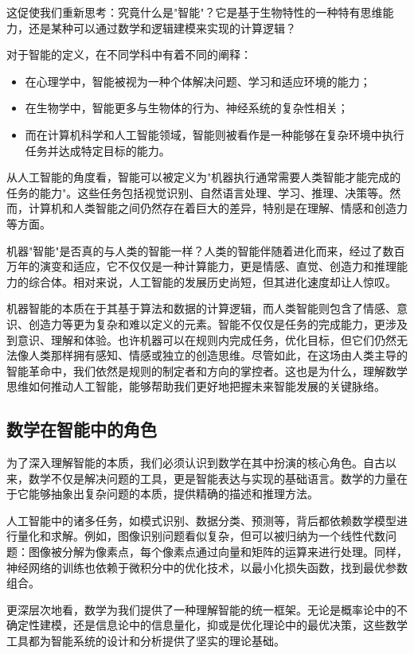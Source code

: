这促使我们重新思考：究竟什么是"智能"？它是基于生物特性的一种特有思维能力，还是某种可以通过数学和逻辑建模来实现的计算逻辑？

对于智能的定义，在不同学科中有着不同的阐释：
\begin{itemize}
\item 在心理学中，智能被视为一种个体解决问题、学习和适应环境的能力；
\item 在生物学中，智能更多与生物体的行为、神经系统的复杂性相关；
\item 而在计算机科学和人工智能领域，智能则被看作是一种能够在复杂环境中执行任务并达成特定目标的能力。
\end{itemize}

从人工智能的角度看，智能可以被定义为"机器执行通常需要人类智能才能完成的任务的能力"。这些任务包括视觉识别、自然语言处理、学习、推理、决策等。然而，计算机和人类智能之间仍然存在着巨大的差异，特别是在理解、情感和创造力等方面。

机器"智能"是否真的与人类的智能一样？人类的智能伴随着进化而来，经过了数百万年的演变和适应，它不仅仅是一种计算能力，更是情感、直觉、创造力和推理能力的综合体。相对来说，人工智能的发展历史尚短，但其进化速度却让人惊叹。

机器智能的本质在于其基于算法和数据的计算逻辑，而人类智能则包含了情感、意识、创造力等更为复杂和难以定义的元素。智能不仅仅是任务的完成能力，更涉及到意识、理解和体验。也许机器可以在规则内完成任务，优化目标，但它们仍然无法像人类那样拥有感知、情感或独立的创造思维。尽管如此，在这场由人类主导的智能革命中，我们依然是规则的制定者和方向的掌控者。这也是为什么，理解数学思维如何推动人工智能，能够帮助我们更好地把握未来智能发展的关键脉络。

\subsection*{数学在智能中的角色}

为了深入理解智能的本质，我们必须认识到数学在其中扮演的核心角色。自古以来，数学不仅是解决问题的工具，更是智能表达与实现的基础语言。数学的力量在于它能够抽象出复杂问题的本质，提供精确的描述和推理方法。

人工智能中的诸多任务，如模式识别、数据分类、预测等，背后都依赖数学模型进行量化和求解。例如，图像识别问题看似复杂，但可以被归纳为一个线性代数问题：图像被分解为像素点，每个像素点通过向量和矩阵的运算来进行处理。同样，神经网络的训练也依赖于微积分中的优化技术，以最小化损失函数，找到最优参数组合。

更深层次地看，数学为我们提供了一种理解智能的统一框架。无论是概率论中的不确定性建模，还是信息论中的信息量化，抑或是优化理论中的最优决策，这些数学工具都为智能系统的设计和分析提供了坚实的理论基础。

